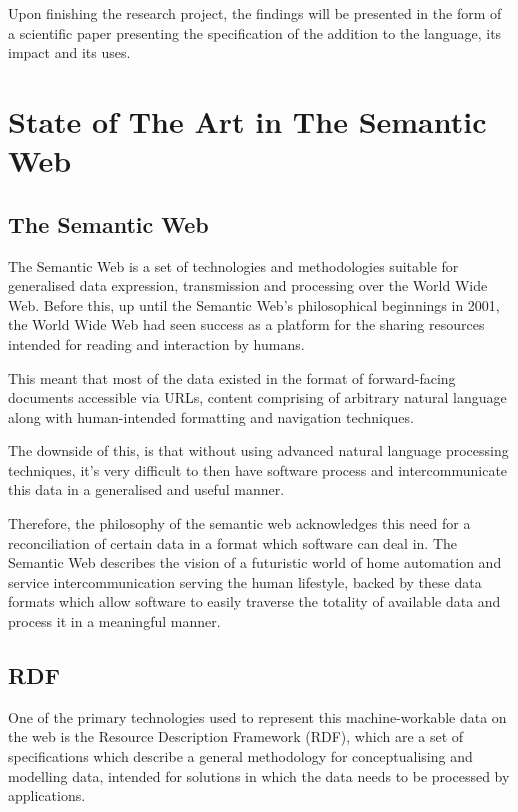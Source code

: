 \documentclass{article}
\begin{document}
Upon finishing the research project, the findings will be presented in the form
of a scientific paper presenting the specification of the addition to the
language, its impact and its uses.

\section{State of The Art in The Semantic Web}

\subsection{The Semantic Web}

The Semantic Web is a set of technologies and methodologies suitable for
generalised data expression, transmission and processing over the World Wide
Web. Before this, up until the Semantic Web's philosophical beginnings in
2001, the World Wide Web had seen success as a platform for the
sharing resources intended for reading and interaction by humans.

This meant that most of the data existed in the format of forward-facing 
documents accessible via URLs, content comprising of arbitrary natural language
along with human-intended formatting and navigation techniques.

The downside of this, is that without using advanced natural language 
processing techniques, it's very difficult to then have software process and
intercommunicate this data in a generalised and useful manner.

Therefore, the philosophy of the semantic web acknowledges this need for a
reconciliation of certain data in a format which software can deal in. The
Semantic Web\cite{semweb} describes the vision of a futuristic world of home
automation and service intercommunication serving the human lifestyle, backed by
these data formats which allow software to easily traverse the totality of
available data and process it in a meaningful manner. 

\subsection{RDF}

One of the primary technologies used to represent this machine-workable data on
the web is the Resource Description Framework (RDF), which are a set of
specifications which describe a general methodology for conceptualising and
modelling data, intended for solutions in which the data needs to be processed
by applications.
\end{document}
